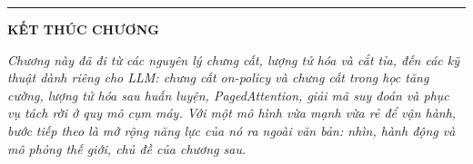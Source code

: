 \bigskip
\hrule
\bigskip

\begin{center}
    \textbf{\Large KẾT THÚC CHƯƠNG \thechapter}
\end{center}

\textit{Chương này đã đi từ các nguyên lý chưng cất, lượng tử hóa và cắt tỉa, đến các kỹ thuật dành riêng cho LLM: chưng cất on-policy và chưng cất trong học tăng cường, lượng tử hóa sau huấn luyện, PagedAttention, giải mã suy đoán và phục vụ tách rời ở quy mô cụm máy. Với một mô hình vừa mạnh vừa rẻ để vận hành, bước tiếp theo là mở rộng năng lực của nó ra ngoài văn bản: nhìn, hành động và mô phỏng thế giới, chủ đề của chương sau.}
